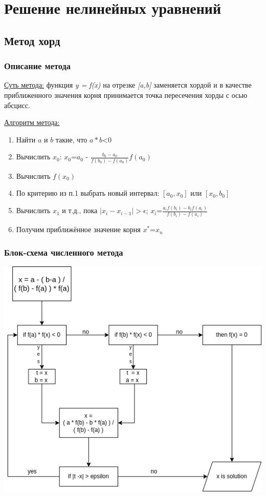 \tableofcontents

\newpage


\section{Решение нелинейных уравнений}

\subsection{Метод хорд}

\subsubsection{Описание метода}
\underline{Суть метода:} функция \textit{y = f(x)} на отрезке \textit{[a,b]} заменяется хордой и в качестве приближенного
значения корня принимается точка пересечения хорды с осью абсцисс.


\underline{Алгоритм метода:}
\begin{enumerate}
    \item Найти $a$ и $b$ такие, что $a*b$<$0$
    \item Вычислить $x_0$:  $x_0$=$a_0$ - $\frac{b_0-a_0}{f(b_0)-f(a_0)}$$f(a_0)$
    \item Вычислить $f(x_0)$
    \item По критерию из п.1 выбрать новый интервал: $[a_0,x_0]$ или $[x_0,b_0]$
    \item Вычислить $x_1$ и т.д., пока $|x_i - x_{i-1}|>\epsilon$; $x_i$=$\frac{a_{i}f(b_i)-b_{i}f(a_i)}{f(b_i)-f(a_i)}$
    \item Получим приближённое значение корня $x^*$=$x_n$
\end{enumerate}

\subsubsection{Блок-схема численного метода}
\includegraphics[scale=0.3]{img/block_2_chord}

